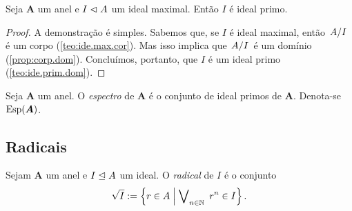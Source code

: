 \begin{proposition}
	Seja $\bm A$ um anel e $I \mathrel{\lhd} A$ um ideal maximal. Então $I$ é ideal primo.
\end{proposition}
\begin{proof}
	A demonstração é simples. Sabemos que, se $I$ é ideal maximal, então $\quo{A}{I}$ é um corpo (\ref{teo:ide.max.cor}). Mas isso implica que $\quo{A}{I}$ é um domínio (\ref{prop:corp.dom}). Concluímos, portanto, que $I$ é um ideal primo (\ref{teo:ide.prim.dom}).
\end{proof}

\begin{definition}
Seja $\bm A$ um anel. O \emph{espectro} de $\bm A$ é o conjunto de ideal primos de $\bm A$. Denota-se $\operatorname{Esp}(\bm A)$.
\end{definition}

\subsection{Radicais}

\begin{definition}
Sejam $\bm A$ um anel e $I \mathrel{\unlhd} A$ um ideal. O \emph{radical} de $I$ é o conjunto
	\begin{equation*}
	\sqrt{I} := \left\{{r \in A}\;\middle\vert\;{\bigvee\nolimits_{n \in \mathbb{N}}\  r^n \in I}\right\}.
	\end{equation*}
\end{definition}

